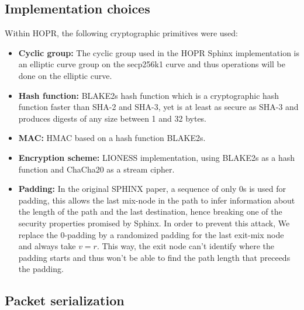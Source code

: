\subsection{Implementation choices}
Within HOPR, the following cryptographic primitives were used:
\begin{itemize}
    \item \textbf{Cyclic group:} The cyclic group used in the HOPR Sphinx implementation is an elliptic curve group on the secp256k1 curve and thus operations will be done on the elliptic curve.
    \item \textbf{Hash function:} BLAKE2s hash function which is a cryptographic hash function faster than SHA-2 and SHA-3, yet is at least as secure as SHA-3 and produces digests of any size between 1 and 32 bytes.
    \item \textbf{MAC:} HMAC based on a hash function BLAKE2s.
    \item \textbf{Encryption scheme:} LIONESS \cite{lionesspaper} implementation, using BLAKE2s as a hash function and ChaCha20 as a stream cipher.
    \item \textbf{Padding:} In the original SPHINX paper, a sequence of only 0s is used for padding, this allows the last mix-node in the path to infer information about the length of the path and the last destination, hence breaking one of the security properties promised by Sphinx. In order to prevent this attack, We replace the 0-padding by a randomized padding for the last exit-mix node and always take $v=r$. This way, the exit node can't identify where the padding starts and thus won't be able to find the path length that preceeds the padding.
\end{itemize}
\subsection{Packet serialization}




